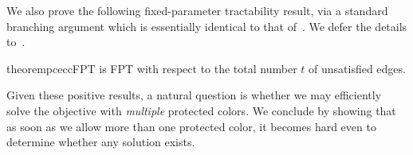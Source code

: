We also prove the following fixed-parameter tractability result, via a standard branching argument which is essentially identical to that of~.
We defer the details to~.
\begin{restatable}{theorem}{pceccFPT}\label{thm:pc-ECC-FPT}
    \pcECC{} is FPT with respect to the total number $t$ of unsatisfied edges.
\end{restatable}

Given these positive results, a natural question is whether we may efficiently solve the \minecc{} objective with \emph{multiple} protected colors.
We conclude by showing that as soon as we allow more than one protected color, it becomes hard even to determine whether any solution exists.  


